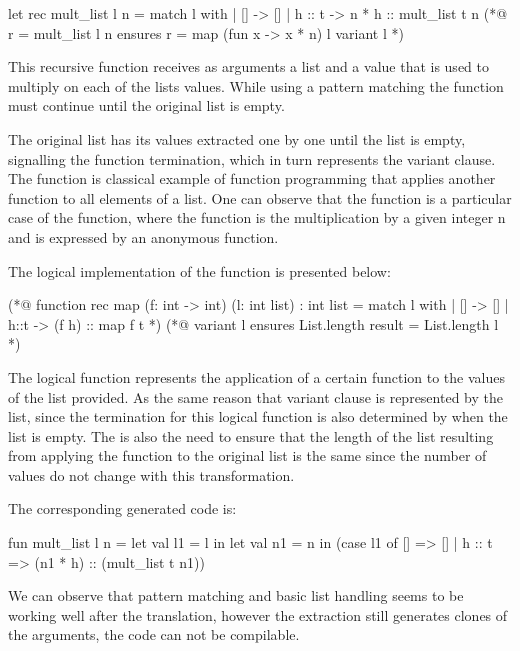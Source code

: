 \begin{gospell}
let rec mult_list l n =
    match l with
    | [] -> []
    | h :: t -> n * h :: mult_list t n
(*@ r = mult_list l n
        ensures r = map (fun x -> x * n) l
        variant l *)
\end{gospell}

This recursive function  receives as arguments a list and a value that is used to multiply on each of the
lists values. While using a pattern matching the function must continue until the original list is empty.

The original list has its values extracted one by one until the list is empty, signalling the function termination, which in turn
represents the variant clause. The function  is classical example of function programming that applies another function 
to all elements of a list. One can observe that the  function is a particular case of the  
function, where the function is the multiplication by a given integer n and is expressed by an anonymous function. 

The logical implementation of the  function is presented below:

\begin{gospell}
(*@ function rec map (f: int -> int) (l: int list) : int list = 
        match l with
        | [] -> []
        | h::t -> (f h) :: map f t *)
(*@ variant l
        ensures List.length result = List.length l *)
\end{gospell}

The logical function  represents the application of a certain function to the values of the list provided. As the same
reason that variant clause is represented by the list, since the termination for this logical function is also determined by when the
list is empty. The is also the need to ensure that the length of the list resulting from applying the function to the original list
is the same since the number of values do not change with this transformation.

The corresponding generated code is:

\begin{cakeml}
fun mult_list l n = let val l1 = l in
    let val n1 = n in
    (case l1 of
        [] => []
    | h :: t => (n1 * h) :: (mult_list t n1))
\end{cakeml}

We can observe that pattern matching and basic list handling seems to be working well after the translation, however the extraction 
still generates clones of the arguments, the code can not be compilable. 

